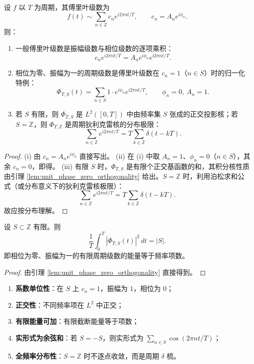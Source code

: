 \begin{theorem}\label{thm:unit_phase_zero_fourier_relation}
设 $f$ 以 $T$ 为周期，其傅里叶级数为
\[
f(t)\sim \sum_{n\in\mathbb{Z}} c_n e^{i2\pi n t/T},
\qquad c_n=A_n e^{i\phi_n}.
\]
则：
\begin{enumerate}[label=(\roman*)]
    \item 一般傅里叶级数是振幅级数与相位级数的逐项乘积：
    \[
    c_n e^{i2\pi n t/T}
    = A_n e^{i\phi_n}e^{i2\pi n t/T}.
    \]
    \item 相位为零、振幅为一的周期级数是傅里叶级数在 $c_n=1$（$n\in S$）时的归一化特例：
    \[
    \Phi_{T,S}(t)=\sum_{n\in S}1\cdot e^{i\phi_n}e^{i2\pi n t/T},
    \qquad \phi_n=0,\ A_n=1.
    \]
    \item 若 $S$ 有限，则 $\Phi_{T,S}$ 是 $L^2([0,T])$ 中由频率集 $S$ 张成的正交投影核；若 $S=\mathbb{Z}$，则 $\Phi_{T,\mathbb{Z}}$ 是周期狄利克雷核的分布极限：
    \[
    \sum_{n\in\mathbb{Z}}e^{i2\pi n t/T}
    = T\sum_{k\in\mathbb{Z}}\delta(t-kT).
    \]
\end{enumerate}
\end{theorem}

\begin{proof}
(i) 由 $c_n=A_n e^{i\phi_n}$ 直接写出。
(ii) 在 (i) 中取 $A_n=1$、$\phi_n=0$（$n\in S$），其余 $c_n=0$，即得。
(iii) 有限 $S$ 时，$\Phi_{T,S}$ 是有限个正交基函数的和，其积分核性质由引理 \ref{lem:unit_phase_zero_orthogonality} 给出。$S=\mathbb{Z}$ 时，利用泊松求和公式（或分布意义下的狄利克雷核极限）：
\[
\sum_{n\in\mathbb{Z}}e^{i2\pi n t/T}
= T\sum_{k\in\mathbb{Z}}\delta(t-kT).
\]
故应按分布理解。
\end{proof}

\begin{corollary}[有限归一化基的帕塞瓦尔恒等式]\label{cor:unit_phase_zero_parseval}
设 $S\subset\mathbb{Z}$ 有限。则
\[
\frac{1}{T}\int_0^T |\Phi_{T,S}(t)|^2\,dt = |S|.
\]
即相位为零、振幅为一的有限周期级数的能量等于频率项数。
\end{corollary}

\begin{proof}
由引理 \ref{lem:unit_phase_zero_orthogonality} 直接得到。
\end{proof}

\begin{property}\label{prop:unit_phase_zero_properties}
\begin{enumerate}[label=(\roman*)]
    \item \textbf{系数单位性}：在 $S$ 上 $c_n=1$，振幅为 $1$，相位为 $0$；
    \item \textbf{正交性}：不同频率项在 $L^2$ 中正交；
    \item \textbf{有限能量可加}：有限截断能量等于项数；
    \item \textbf{实形式为余弦和}：若 $S=-S$，则实形式为 $\sum_{n\in S}\cos(2\pi n t/T)$；
    \item \textbf{全频率分布性}：$S=\mathbb{Z}$ 时不逐点收敛，而是周期 $\delta$ 梳。
\end{enumerate}
\end{property}

